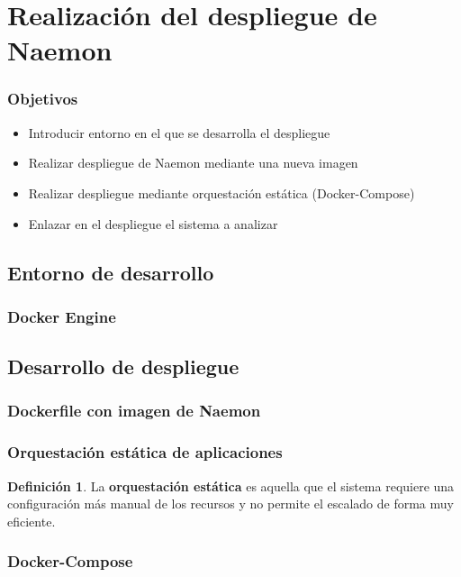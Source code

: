 \documentclass{beamer}
\theoremstyle{plain}
\theoremstyle{definition}
\newtheorem{defn}[thm]{Definici\'{o}n}
\theoremstyle{plain}
\theoremstyle{definition}
\theoremstyle{remark}
\theoremstyle{definition}
\begin{document}
\section{Realización del despliegue de Naemon} %
\begin{frame}
	
	\frametitle{Objetivos}
	\begin{itemize}
		\item Introducir entorno en el que se desarrolla el despliegue
		\item Realizar despliegue de Naemon mediante una nueva imagen
		\item Realizar despliegue mediante orquestación estática (Docker-Compose)
		\item Enlazar en el despliegue el sistema a analizar
	\end{itemize}
	
\end{frame}

\subsection{Entorno de desarrollo}
\begin{frame}
	\frametitle{Docker Engine}
	
\end{frame}
\subsection{Desarrollo de despliegue}
\begin{frame}
	\frametitle{Dockerfile con imagen de Naemon}
	
\end{frame}
\begin{frame}
	\frametitle{Orquestación estática de aplicaciones}
	\begin{defn}
		La \textbf{orquestación estática} es aquella que el sistema requiere una configuración más
		manual de los recursos y no permite el escalado de forma muy eficiente.
	\end{defn}
\end{frame}
\begin{frame}
	\frametitle{Docker-Compose}
\end{frame}
\end{document}
